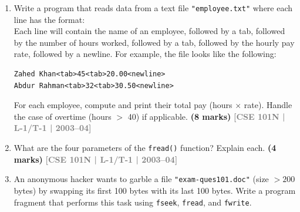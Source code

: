 \documentclass[12pt,a3paper]{article}
\newcommand{\yr}[1]{\hfill\textcolor{gray}{\small\textbf{[#1]}}}
\newcommand{\mk}[1]{\textcolor{orange!70!black}{\small\textbf{(#1 marks)}}}
\begin{document}
\begin{enumerate}
\item Write a program that reads data from a text file \texttt{"employee.txt"} where each line has the format:\\
Each line will contain the name of an employee, followed by a tab, followed by the number of hours worked, followed by a tab, followed by the hourly pay rate, followed by a newline. For example, the file looks like the following:\\
\begin{lstlisting}
Zahed Khan<tab>45<tab>20.00<newline>
Abdur Rahman<tab>32<tab>30.50<newline>
\end{lstlisting}
For each employee, compute and print their total pay (hours $\times$ rate). Handle the case of overtime (hours $>$ 40) if applicable.
\mk{8} \yr{CSE 101N | L-1/T-1 | 2003--04}

\item What are the four parameters of the \texttt{fread()} function? Explain each.
\mk{4} \yr{CSE 101N | L-1/T-1 | 2003--04}

\item An anonymous hacker wants to garble a file \texttt{"exam-ques101.doc"} (size $> 200$ bytes) by swapping its first 100 bytes with its last 100 bytes. Write a program fragment that performs this task using \texttt{fseek}, \texttt{fread}, and \texttt{fwrite}.
\begin{center}
\end{center}
\end{enumerate}
\end{document}
